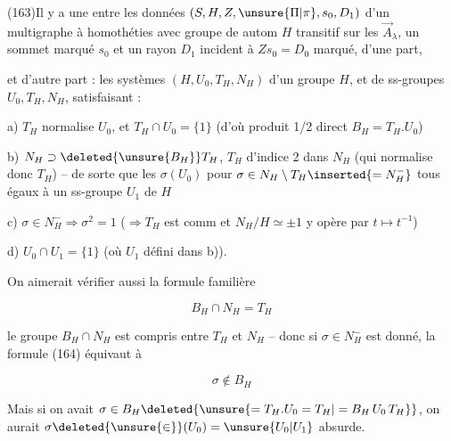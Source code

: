 

(163)\quad Il y a une  entre les données $(S,H,Z,\unsure{\Pi|\pi},s_0,D_1)$ d'un multigraphe à homothéties avec groupe de autom $H$  transitif sur les $\overrightarrow A_\lambda$, un sommet marqué $s_0$ et un rayon $D_1$ incident à $Zs_0=D_0$ marqué,  d'une part,

et d'autre part : les systèmes $(H,U_0,T_H,N_H)$ d'un groupe $H$, et de ss-groupes $U_0,T_H,N_H$, satisfaisant :

a) $T_H$ normalise $U_0$, et $T_H\cap U_0=\{1\}$ (d'où produit 1/2 direct $B_H=T_H.U_0$)

b) $N_H\supset\deleted{\unsure{B_H}}T_H$, $T_H$ d'indice  2 dans $N_H$ (qui normalise donc $T_H$) -- de sorte que les $\sigma(U_0)$ pour $\sigma\in N_H\setminus T_H\inserted{=N_H^-}$  tous égaux à un  ss-groupe $U_1$ de $H$

c)  $\sigma\in N_H^-\Longrightarrow\sigma^2=1$ ($\Rightarrow T_H$ est comm et $N_H/H\simeq\pm1$ y opère par $t\mapsto t^{-1}$)

d) $U_0\cap U_1=\{1\}$ (où $U_1$ défini dans b)).

On aimerait vérifier aussi la formule familière

\[
B_H\cap N_H=T_H\tag*{(164)}
\]


 le groupe $B_H\cap N_H$ est compris entre $T_H$ et $N_H$ -- donc si $\sigma\in N_H^-$ est donné, la formule (164) équivaut à

\[
\sigma\notin B_H\tag*{(165)}
\]

Mais si on avait $\sigma\in B_H\deleted{\unsure{=T_H.U_0=T_H|=B_H\,U_0\,T_H}}$, on aurait $\sigma\deleted{\unsure{\in}}(U_0)=\unsure{U_0|U_1}$  absurde.


